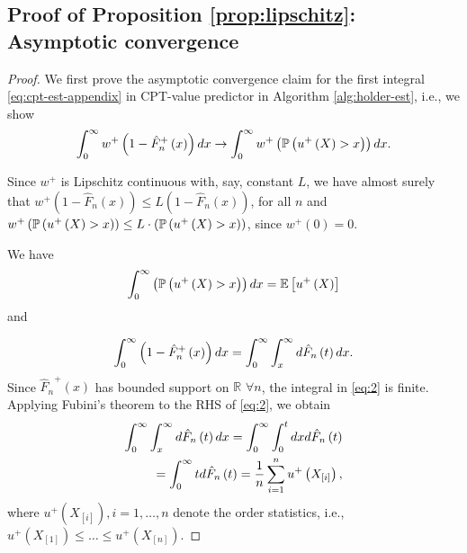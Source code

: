 \subsection*{Proof of Proposition \ref{prop:lipschitz}: Asymptotic convergence}
\begin{proof}
We first prove the asymptotic convergence claim for the first integral  \eqref{eq:cpt-est-appendix} in CPT-value predictor in Algorithm \ref{alg:holder-est}, i.e., we show
\begin{align}
\int_0^{\infty} w^+\left(1-{\hat F_n}^+\left(x\right)\right)  dx \rightarrow \int_0^{\infty} w^+\left(\mathbb{P}\left( u^+\left(X\right)>x \right)\right) dx.\label{eq:3}
\end{align} 

Since $w^+$ is Lipschitz continuous with, say, constant $L$, we have almost surely that
$w^{+}\left(1-\hat{F}_n\left(x\right)\right) \leq L \left(1-\hat{F}_n\left(x\right)\right)$,  
for all $n$ and 
 $w^{+}\left(\mathbb{P}\left( u^+\left(X\right)>x \right)\right) \leq L\cdot \left(\mathbb{P}\left( u^+\left(X\right)>x \right)\right)$, since $w^+\left(0\right)=0$.
 

We have
$$\int_0^{\infty} \left(\mathbb{P}\left( u^+\left(X\right)>x \right)\right)  dx = \mathbb{E}\left[u^+\left(X\right)\right]$$
and

\begin{equation}
\int_0^{\infty} \left(1-{\hat F_n}^+\left(x\right)\right)  dx =\int_0^{\infty} \int_x^\infty d \hat{F}_n\left(t\right) dx.\label{eq:2}
\end{equation}
Since ${\hat F_n}^+\left(x\right)$ has bounded support on $\mathbb{R}$ $\forall n$, the integral in \eqref{eq:2} is finite.
Applying Fubini's theorem to the RHS of \eqref{eq:2}, we obtain
\begin{align*}
\int_0^{\infty} \int_x^\infty d \hat{F}_n\left(t\right) dx = \int_0^{\infty} \int_0^t dx d \hat{F}_n\left(t\right) \\
= \int_0^{\infty} t d\hat{F}_n\left(t\right) = \frac{1}{n} \sum_{i=1}^n u^+\left(X_{[i]}\right),
 \end{align*}
 where $u^+\left(X_{[i]}\right), i=1,\ldots,n$ denote the order statistics, i.e., $u^+\left(X_{[1]}\right) \le \ldots \le u^+\left(X_{[n]}\right)$.
 

\end{proof}
